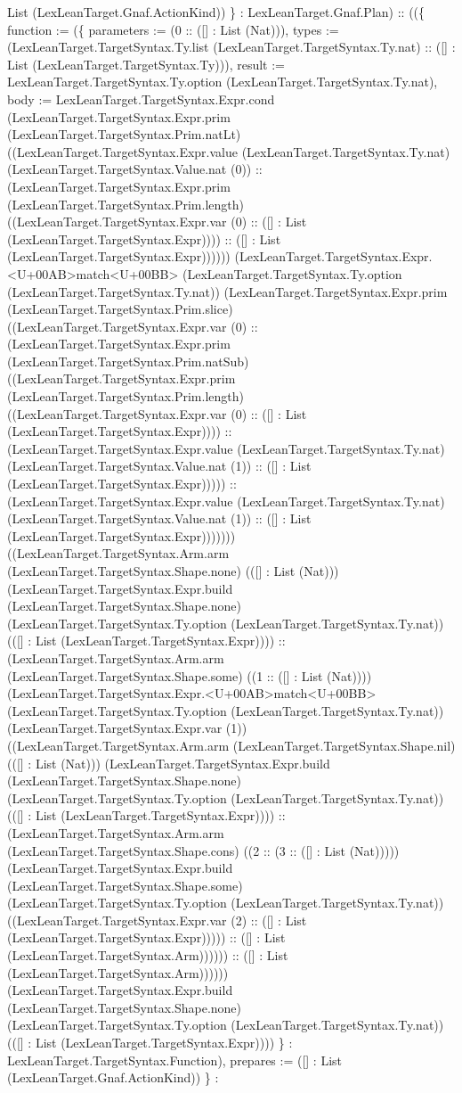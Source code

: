 \documentclass[11pt]{article}
\begin{document}
List (LexLeanTarget.Gnaf.ActionKind)) \} : LexLeanTarget.Gnaf.Plan) :: ((\{ function := (\{ parameters := (0 :: ([] : List (Nat))), types := (LexLeanTarget.TargetSyntax.Ty.list (LexLeanTarget.TargetSyntax.Ty.nat) :: ([] : List (LexLeanTarget.TargetSyntax.Ty))), result := LexLeanTarget.TargetSyntax.Ty.option (LexLeanTarget.TargetSyntax.Ty.nat), body := LexLeanTarget.TargetSyntax.Expr.cond (LexLeanTarget.TargetSyntax.Expr.prim (LexLeanTarget.TargetSyntax.Prim.natLt) ((LexLeanTarget.TargetSyntax.Expr.value (LexLeanTarget.TargetSyntax.Ty.nat) (LexLeanTarget.TargetSyntax.Value.nat (0)) :: (LexLeanTarget.TargetSyntax.Expr.prim (LexLeanTarget.TargetSyntax.Prim.length) ((LexLeanTarget.TargetSyntax.Expr.var (0) :: ([] : List (LexLeanTarget.TargetSyntax.Expr)))) :: ([] : List (LexLeanTarget.TargetSyntax.Expr)))))) (LexLeanTarget.TargetSyntax.Expr.<U+00AB>match<U+00BB> (LexLeanTarget.TargetSyntax.Ty.option (LexLeanTarget.TargetSyntax.Ty.nat)) (LexLeanTarget.TargetSyntax.Expr.prim (LexLeanTarget.TargetSyntax.Prim.slice) ((LexLeanTarget.TargetSyntax.Expr.var (0) :: (LexLeanTarget.TargetSyntax.Expr.prim (LexLeanTarget.TargetSyntax.Prim.natSub) ((LexLeanTarget.TargetSyntax.Expr.prim (LexLeanTarget.TargetSyntax.Prim.length) ((LexLeanTarget.TargetSyntax.Expr.var (0) :: ([] : List (LexLeanTarget.TargetSyntax.Expr)))) :: (LexLeanTarget.TargetSyntax.Expr.value (LexLeanTarget.TargetSyntax.Ty.nat) (LexLeanTarget.TargetSyntax.Value.nat (1)) :: ([] : List (LexLeanTarget.TargetSyntax.Expr))))) :: (LexLeanTarget.TargetSyntax.Expr.value (LexLeanTarget.TargetSyntax.Ty.nat) (LexLeanTarget.TargetSyntax.Value.nat (1)) :: ([] : List (LexLeanTarget.TargetSyntax.Expr))))))) ((LexLeanTarget.TargetSyntax.Arm.arm (LexLeanTarget.TargetSyntax.Shape.none) (([] : List (Nat))) (LexLeanTarget.TargetSyntax.Expr.build (LexLeanTarget.TargetSyntax.Shape.none) (LexLeanTarget.TargetSyntax.Ty.option (LexLeanTarget.TargetSyntax.Ty.nat)) (([] : List (LexLeanTarget.TargetSyntax.Expr)))) :: (LexLeanTarget.TargetSyntax.Arm.arm (LexLeanTarget.TargetSyntax.Shape.some) ((1 :: ([] : List (Nat)))) (LexLeanTarget.TargetSyntax.Expr.<U+00AB>match<U+00BB> (LexLeanTarget.TargetSyntax.Ty.option (LexLeanTarget.TargetSyntax.Ty.nat)) (LexLeanTarget.TargetSyntax.Expr.var (1)) ((LexLeanTarget.TargetSyntax.Arm.arm (LexLeanTarget.TargetSyntax.Shape.nil) (([] : List (Nat))) (LexLeanTarget.TargetSyntax.Expr.build (LexLeanTarget.TargetSyntax.Shape.none) (LexLeanTarget.TargetSyntax.Ty.option (LexLeanTarget.TargetSyntax.Ty.nat)) (([] : List (LexLeanTarget.TargetSyntax.Expr)))) :: (LexLeanTarget.TargetSyntax.Arm.arm (LexLeanTarget.TargetSyntax.Shape.cons) ((2 :: (3 :: ([] : List (Nat))))) (LexLeanTarget.TargetSyntax.Expr.build (LexLeanTarget.TargetSyntax.Shape.some) (LexLeanTarget.TargetSyntax.Ty.option (LexLeanTarget.TargetSyntax.Ty.nat)) ((LexLeanTarget.TargetSyntax.Expr.var (2) :: ([] : List (LexLeanTarget.TargetSyntax.Expr))))) :: ([] : List (LexLeanTarget.TargetSyntax.Arm)))))) :: ([] : List (LexLeanTarget.TargetSyntax.Arm)))))) (LexLeanTarget.TargetSyntax.Expr.build (LexLeanTarget.TargetSyntax.Shape.none) (LexLeanTarget.TargetSyntax.Ty.option (LexLeanTarget.TargetSyntax.Ty.nat)) (([] : List (LexLeanTarget.TargetSyntax.Expr)))) \} : LexLeanTarget.TargetSyntax.Function), prepares := ([] : List (LexLeanTarget.Gnaf.ActionKind)) \} : 
\end{document}
